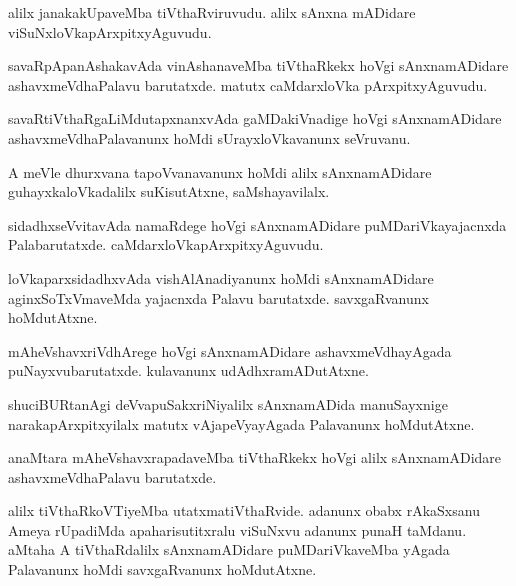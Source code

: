 \documentclass{article}
\begin{document}
\begin{mn}
alilx janakakUpaveMba tiVthaRviruvudu. alilx sAnxna mADidare viSuNxloVkapArxpitxyAguvudu.
\end{mn}

\begin{mn}
savaRpApanAshakavAda vinAshanaveMba tiVthaRkekx hoVgi sAnxnamADidare ashavxmeVdhaPalavu
barutatxde. matutx caMdarxloVka pArxpitxyAguvudu.
\end{mn}

\begin{mn}
savaRtiVthaRgaLiMdutapxnanxvAda gaMDakiVnadige hoVgi sAnxnamADidare ashavxmeVdhaPalavanunx hoMdi
sUrayxloVkavanunx seVruvanu.
\end{mn}

\begin{mn}
A meVle dhurxvana tapoVvanavanunx hoMdi alilx sAnxnamADidare guhayxkaloVkadalilx suKisutAtxne, 
saMshayavilalx.
\end{mn}

\begin{mn}
sidadhxseVvitavAda namaRdege hoVgi sAnxnamADidare puMDariVkayajacnxda Palabarutatxde. 
caMdarxloVkapArxpitxyAguvudu.
\end{mn}

\begin{mn}
loVkaparxsidadhxvAda vishAlAnadiyanunx hoMdi sAnxnamADidare aginxSoTxVmaveMda 
yajacnxda Palavu barutatxde. savxgaRvanunx hoMdutAtxne.
\end{mn}

\begin{mn}
mAheVshavxriVdhArege hoVgi sAnxnamADidare ashavxmeVdhayAgada puNayxvubarutatxde. kulavanunx 
udAdhxramADutAtxne.
\end{mn}

\begin{mn}
shuciBURtanAgi deVvapuSakxriNiyalilx sAnxnamADida manuSayxnige narakapArxpitxyilalx matutx 
vAjapeVyayAgada Palavanunx hoMdutAtxne.
\end{mn}

\begin{mn}
anaMtara mAheVshavxrapadaveMba tiVthaRkekx hoVgi alilx sAnxnamADidare ashavxmeVdhaPalavu barutatxde.
\end{mn}

\begin{mn}
alilx tiVthaRkoVTiyeMba utatxmatiVthaRvide. adanunx obabx rAkaSxsanu Ameya rUpadiMda 
apaharisutitxralu viSuNxvu adanunx punaH taMdanu. aMtaha A tiVthaRdalilx sAnxnamADidare 
puMDariVkaveMba yAgada Palavanunx hoMdi savxgaRvanunx hoMdutAtxne.
\end{mn}
\end{document}
